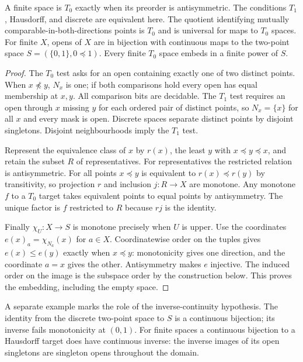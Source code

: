 \begin{theorem}\label{idx-finite159}
A finite space is $T_0$ exactly when its preorder is antisymmetric. The
conditions $T_1$, Hausdorff, and discrete are equivalent here. The quotient
identifying mutually comparable-in-both-directions points is $T_0$ and
is universal for maps to $T_0$ spaces. For finite $X$, opens of $X$ are in
bijection with continuous maps to the two-point space
$S=(\{0,1\},0\preceq 1)$. Every finite $T_0$ space embeds in a finite
power of $S$.
\end{theorem}
\begin{proof}
The $T_0$ test asks for an open containing exactly one of two distinct
points. When $x\not\preceq y$, $N_x$ is one; if both comparisons hold every
open has equal membership at $x,y$. All comparison bits are decidable.
The $T_1$ test requires an open through $x$ missing $y$ for each ordered
pair of distinct points, so $N_x=\{x\}$ for all $x$ and every mask is open.
Discrete spaces separate distinct points by disjoint singletons. Disjoint
neighbourhoods imply the $T_1$ test.

Represent the equivalence class of $x$ by $r(x)$, the least $y$ with
$x\preceq y\preceq x$, and retain the subset $R$ of representatives. For
representatives the restricted relation is antisymmetric. For all points
$x\preceq y$ is equivalent to $r(x)\preceq r(y)$ by transitivity, so
projection $r$ and inclusion $j:R\to X$ are monotone. Any monotone $f$
to a $T_0$ target takes equivalent points to equal points by antisymmetry.
The unique factor is $f$ restricted to $R$ because $rj$ is the identity.

Finally $\chi_U:X\to S$ is monotone precisely when $U$ is upper. Use the
coordinates $e(x)_a=\chi_{N_a}(x)$ for $a\in X$. Coordinatewise order
on the tuples gives $e(x)\le e(y)$ exactly when $x\preceq y$: monotonicity
gives one direction, and the coordinate $a=x$ gives the other. Antisymmetry
makes $e$ injective. The induced order on the image is the subspace order
by the construction below. This proves the embedding, including the empty
space.
\end{proof}

A separate example marks the role of the inverse-continuity hypothesis.
The identity from the discrete two-point space to $S$ is a continuous
bijection; its inverse fails monotonicity at $(0,1)$. For finite spaces a
continuous bijection to a Hausdorff target does have continuous inverse:
the inverse images of its open singletons are singleton opens throughout
the domain.

